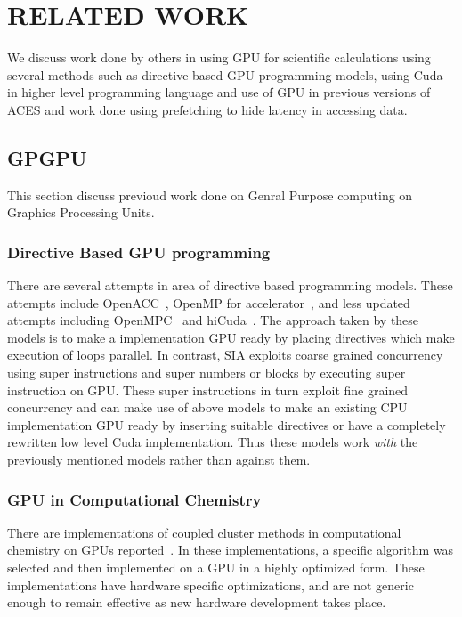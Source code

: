 \chapter{RELATED WORK} \label{lit}

We discuss work done by others in using GPU for scientific calculations using
several methods such as directive based GPU programming models, using Cuda in
higher level programming language and use of GPU in previous versions of ACES
and work done using prefetching to hide latency in accessing data.

\section{GPGPU}
This section discuss previoud work done on Genral Purpose computing on Graphics
Processing Units.

\subsection{Directive Based GPU programming}
There are several attempts in area of directive based programming models. These
attempts include OpenACC~\cite{openacc}, OpenMP for
accelerator~\cite{openmpforaccelerators}, and less updated attempts including
OpenMPC~\cite{openmpc} and hiCuda~\cite{hicuda}. The approach taken by these models
is to make a implementation GPU ready by placing directives which make
execution of loops parallel. In contrast, SIA exploits coarse grained
concurrency using super instructions and super numbers or blocks by executing
super instruction on GPU. These super instructions in turn exploit fine grained
concurrency and can make use of above models to make an existing CPU implementation
GPU ready by inserting suitable directives or have a completely rewritten low level
Cuda implementation. Thus these models work \textit{with} the previously mentioned
models rather than against them.

\subsection{GPU in Computational Chemistry}
There are implementations of coupled cluster methods in computational chemistry
on GPUs reported~\cite{bhaskar2013}\cite{deprince2011}\cite{maw2011}. In these
implementations, a specific algorithm was selected and then implemented on a
GPU in a highly optimized form. These implementations have hardware specific
optimizations, and are not generic enough to remain effective as new hardware
development takes place.

